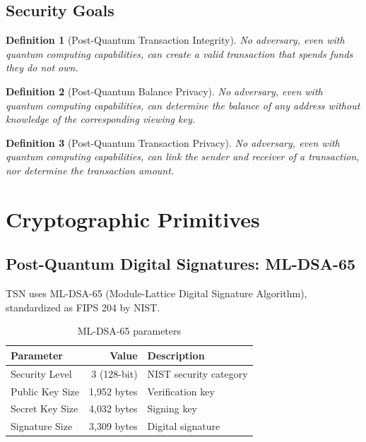 \documentclass[11pt,a4paper]{article}
\newtheorem{definition}{Definition}
\begin{document}
\subsection{Security Goals}

\begin{definition}[Post-Quantum Transaction Integrity]
No adversary, even with quantum computing capabilities, can create a valid transaction that spends funds they do not own.
\end{definition}

\begin{definition}[Post-Quantum Balance Privacy]
No adversary, even with quantum computing capabilities, can determine the balance of any address without knowledge of the corresponding viewing key.
\end{definition}

\begin{definition}[Post-Quantum Transaction Privacy]
No adversary, even with quantum computing capabilities, can link the sender and receiver of a transaction, nor determine the transaction amount.
\end{definition}

\section{Cryptographic Primitives}

\subsection{Post-Quantum Digital Signatures: ML-DSA-65}

TSN uses ML-DSA-65 (Module-Lattice Digital Signature Algorithm), standardized as FIPS 204 by NIST.

\begin{table}[h]
\centering
\begin{tabular}{lrl}
\toprule
Parameter & Value & Description \\
\midrule
Security Level & 3 (128-bit) & NIST security category \\
Public Key Size & 1,952 bytes & Verification key \\
Secret Key Size & 4,032 bytes & Signing key \\
Signature Size & 3,309 bytes & Digital signature \\
\bottomrule
\end{tabular}
\caption{ML-DSA-65 parameters}
\end{table}
\end{document}
